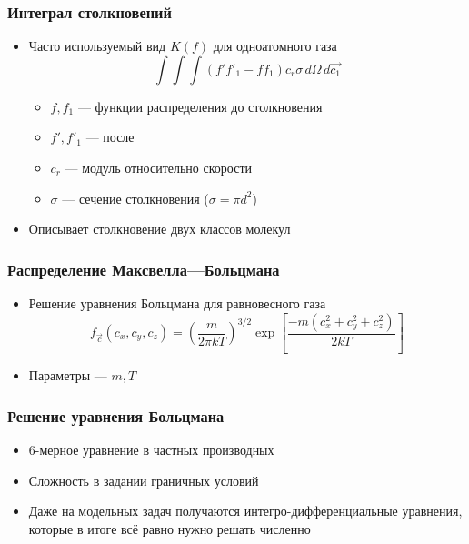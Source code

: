\documentclass[onlymath]{beamer}
\begin{document}
\begin{frame}
  \frametitle{Интеграл столкновений}
  \begin{itemize}
  \item Часто используемый вид $K(f)$ для одноатомного газа
    \begin{equation*}
      \int\int\int(f'f'_1-f f_1) {c_r \sigma \,d\Omega\,d\vec{c_1}}
    \end{equation*}
    \begin{itemize}
    \item $f, f_1$ — функции распределения до столкновения
    \item $f', f'_1$ — после
    \item $c_r$ — модуль относительно скорости
    \item $\sigma$ — сечение столкновения ($\sigma = \pi d^2$)
    \end{itemize}
  \item Описывает столкновение двух классов молекул
  \end{itemize}
\end{frame}

\begin{frame}
  \frametitle{Распределение Максвелла—Больцмана}
  \begin{itemize}
  \item Решение уравнения Больцмана для равновесного газа
    \begin{equation*}
      f_{\vec{c}}(c_x, c_y, c_z) = \left(\frac{m}{2\pi k T}\right)^{3/2}
      \exp\left[ \frac{-m(c_x^2 + c_y^2 + c_z^2)}{2kT} \right]
    \end{equation*}
  \item Параметры — $m, T$
  \end{itemize}
\end{frame}

\begin{frame}
  \frametitle{Решение уравнения Больцмана}
  \begin{itemize}
  \item 6-мерное уравнение в частных производных
  \item Сложность в задании граничных условий
  \item Даже на модельных задач получаются интегро-дифференциальные
    уравнения, которые в итоге всё равно нужно решать численно
  \end{itemize}
\end{frame}
\end{document}

